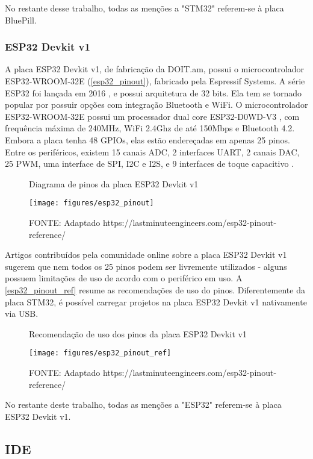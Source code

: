 No restante desse trabalho, todas as menções a "STM32" referem-se à placa
BluePill.


\subsubsection{ESP32 Devkit v1}

A placa ESP32 Devkit v1, de fabricação da DOIT.am, possui o microcontrolador
ESP32-WROOM-32E (\autoref{esp32_pinout}), fabricado pela Espressif Systems.
A série ESP32 foi lançada em 2016 \cite{anuncio_esp32}, e possui arquitetura de
32 bits. Ela tem se tornado popular por possuir opções com integração Bluetooth
e WiFi. O microcontrolador ESP32-WROOM-32E possui um processador dual core
ESP32-D0WD-V3 \cite{esp32_wroom_32e_datasheet}, com frequência máxima de 240MHz,
WiFi 2.4Ghz de até 150Mbps e Bluetooth 4.2. Embora a placa tenha 48 GPIOs, elas
estão endereçadas em apenas 25 pinos. Entre os periféricos, existem 15 canais
ADC, 2 interfaces UART, 2 canais DAC, 25 PWM, uma interface de SPI, I2C e I2S,
e 9 interfaces de toque capacitivo
\cite{esp32_reference_2} \cite{esp32_reference}.

\begin{figure}[ht]
	\centering
	\caption{Diagrama de pinos da placa ESP32 Devkit v1}
	\texttt{[image: figures/esp32\_pinout]}
	\caption*{FONTE: Adaptado https://lastminuteengineers.com/esp32-pinout-reference/}
	\label{esp32_pinout}
\end{figure}

Artigos contribuídos pela comunidade online sobre a placa ESP32 Devkit v1 
\cite{esp32_reference_2} \cite{esp32_reference} sugerem que nem todos os 25
pinos podem ser livremente utilizados - alguns possuem limitações de uso de
acordo com o periférico em uso. A \autoref{esp32_pinout_ref} resume as
recomendações de uso do pinos. Diferentemente da placa STM32, é possível
carregar projetos na placa ESP32 Devkit v1 nativamente via USB.

\begin{figure}[ht]
	\centering
	\caption{Recomendação de uso dos pinos da placa ESP32 Devkit v1}
	\texttt{[image: figures/esp32\_pinout\_ref]}
	\caption*{FONTE: Adaptado https://lastminuteengineers.com/esp32-pinout-reference/}
	\label{esp32_pinout_ref}
\end{figure}

No restante deste trabalho, todas as menções a "ESP32" referem-se à placa
ESP32 Devkit v1.


\subsection{IDE}

